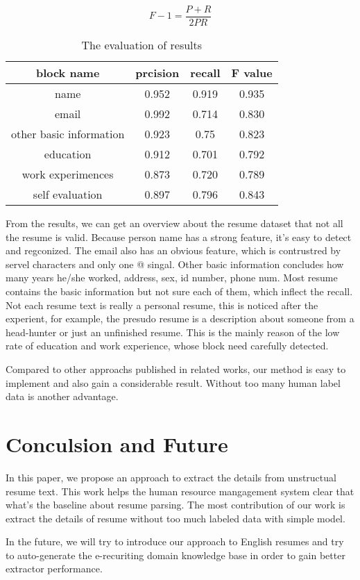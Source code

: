 \documentclass{acm_proc_article-sp}
\begin{document}
$$
F-1 = \frac{P+R}{2PR}
$$

\begin{table}
\centering
\caption{The evaluation of results}
\begin{tabular}{|c|c|c|c|} \hline
block name & prcision & recall & F value\\ \hline
name & 0.952 & 0.919 & 0.935 \\ \hline
email & 0.992 & 0.714 &0.830 \\  \hline
other basic information & 0.923 & 0.75 & 0.823 \\ \hline
education & 0.912 & 0.701 & 0.792\\ \hline
work experimences & 0.873  & 0.720 & 0.789 \\ \hline
self evaluation & 0.897  &0.796 &0.843 \\
\hline\end{tabular}
\end{table}

From the results, we can get an overview about the resume dataset that not all the resume is valid.
Because person name has a strong feature, it's easy to detect and regconized.
The email also has an obvious feature, which is contrustred by servel characters and only one @ singal.
Other basic information concludes how many years he/she worked, address, sex, id number, phone num.
Most resume contains the basic information but not sure each of them, which inflect the recall.
Not each resume text is really a personal resume, this is noticed after the experient, for example, the presudo resume is a description about someone from a head-hunter or just an unfinished resume.
This is the mainly reason of the low rate of education and work experience, whose block need carefully detected.

Compared to other approachs published in related works, our method is easy to implement and also gain a considerable result.
Without too many human label data is another advantage.


\section{Conculsion and Future}

In this paper, we propose an approach to extract the details from unstructual resume text. 
This work helps the human resource mangagement system clear that what's the baseline about resume parsing.
The most contribution of our work is extract the details of resume without too much labeled data with simple model.

In the future, we will try to introduce our approach to English resumes and try to auto-generate the e-recuriting domain knowledge base in order to gain better extractor performance.



 
\end{document}
